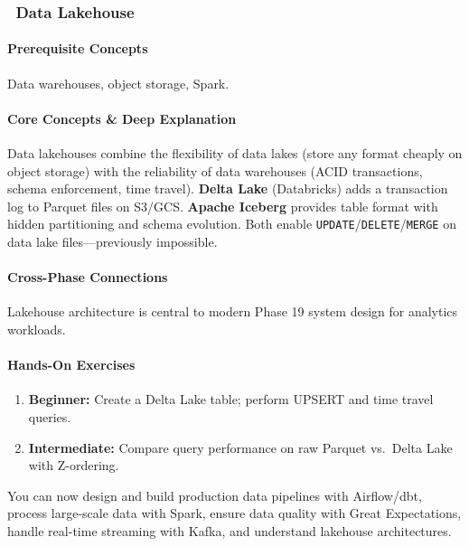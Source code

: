 \documentclass[11pt, a4paper, oneside]{report}
\newcommand{\awareness}[1]{\subsubsection{\texorpdfstring{\fcolorbox{gray!50}{gray!10}{\footnotesize\bfseries\color{gray!50!black} AWARENESS}~#1}{#1}}}
\begin{document}
\awareness{Data Lakehouse}

\paragraph{Prerequisite Concepts} Data warehouses, object storage, Spark.

\paragraph{Core Concepts \& Deep Explanation} Data lakehouses combine the flexibility of data lakes (store any format cheaply on object storage) with the reliability of data warehouses (ACID transactions, schema enforcement, time travel). \textbf{Delta Lake} (Databricks) adds a transaction log to Parquet files on S3/GCS. \textbf{Apache Iceberg} provides table format with hidden partitioning and schema evolution. Both enable \texttt{UPDATE}/\texttt{DELETE}/\texttt{MERGE} on data lake files---previously impossible.

\paragraph{Cross-Phase Connections} Lakehouse architecture is central to modern Phase 19 system design for analytics workloads.

\paragraph{Hands-On Exercises}
\begin{enumerate}[leftmargin=*]
\item \textbf{Beginner:} Create a Delta Lake table; perform UPSERT and time travel queries.
\item \textbf{Intermediate:} Compare query performance on raw Parquet vs.\ Delta Lake with Z-ordering.
\end{enumerate}

\begin{microcheckpoint}
You can now design and build production data pipelines with Airflow/dbt, process large-scale data with Spark, ensure data quality with Great Expectations, handle real-time streaming with Kafka, and understand lakehouse architectures.
\end{microcheckpoint}
\end{document}
